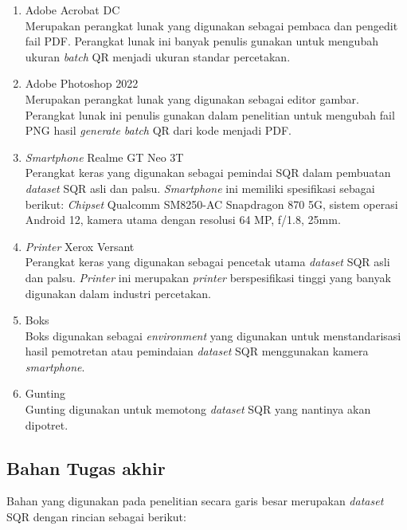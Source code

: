 \begin{enumerate}
	\item Adobe Acrobat DC\\Merupakan perangkat lunak yang digunakan sebagai pembaca dan pengedit fail PDF. Perangkat lunak ini banyak penulis gunakan untuk mengubah
	      ukuran \emph{batch} QR menjadi ukuran standar percetakan.
	\item Adobe Photoshop 2022\\Merupakan perangkat lunak yang digunakan sebagai editor gambar. Perangkat lunak ini penulis gunakan dalam penelitian untuk mengubah fail
	      PNG hasil \emph{generate batch} QR dari kode menjadi PDF.
	\item \emph{Smartphone} Realme GT Neo 3T\\Perangkat keras yang digunakan sebagai pemindai SQR dalam pembuatan \emph{dataset} SQR asli dan palsu. \emph{Smartphone} ini memiliki spesifikasi sebagai berikut: \emph{Chipset} Qualcomm SM8250-AC Snapdragon 870 5G, sistem operasi Android 12, kamera utama dengan resolusi 64 MP, f/1.8, 25mm.
	\item \emph{Printer} Xerox Versant\\Perangkat keras yang digunakan sebagai pencetak utama \emph{dataset} SQR asli dan palsu. \emph{Printer} ini merupakan \emph{printer} berspesifikasi tinggi yang banyak digunakan dalam industri percetakan.
	\item Boks\\Boks digunakan sebagai \emph{environment} yang digunakan untuk menstandarisasi hasil pemotretan atau pemindaian \emph{dataset} SQR menggunakan kamera
	      \emph{smartphone}.
	\item Gunting\\Gunting digunakan untuk memotong \emph{dataset} SQR yang nantinya akan dipotret.
\end{enumerate}

\subsection{Bahan Tugas akhir}

Bahan yang digunakan pada penelitian secara garis besar merupakan \emph{dataset} SQR dengan rincian sebagai berikut:

